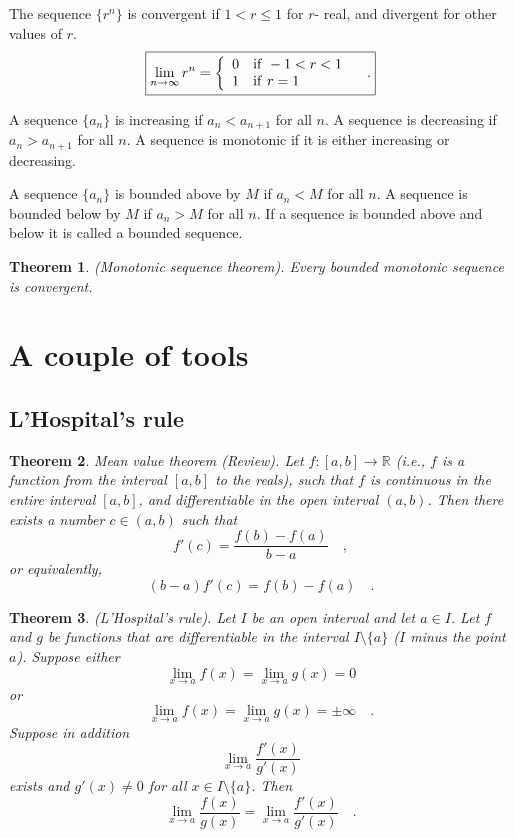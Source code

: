 \documentclass[12pt]{book}
\newcommand{\importantFormula}[1]{\begin{equation} \boxed{#1} \end{equation}}
\newtheorem{theorem}{Theorem}[section]
\begin{document}
The sequence $\{r^n\}$ is convergent if $1< r\leq 1$ for $r$- real, and divergent for other values of $r$.
\importantFormula{\label{eqLimitRtoTheNth}
\lim\limits_{n\to \infty}r^n= \left\{\begin{array}{ll} 0 & \mathrm{if~} -1<r<1\\ 1& \mathrm{if~} r=1\end{array} \right.\quad .
}

A sequence $\{a_n\}$ is increasing if $a_n<a_{n+1}$ for all $n$. A sequence is decreasing if $a_n>a_{n+1}$ for all $n$. A sequence is monotonic if it is either increasing or decreasing.     

A sequence $\{a_n\}$ is bounded above by $M$ if $a_n<M$ for all $n$. A sequence is bounded below by $M$ if $a_n>M$ for all $n$. If a sequence is bounded above and below it is called a bounded sequence. 

\begin{theorem}\label{thMonotonicSequenceThereom}
 (Monotonic sequence theorem). Every bounded monotonic sequence is convergent.
\end{theorem}
\section{A couple of tools}
\subsection{L'Hospital's rule}
\begin{theorem}
 Mean value theorem (Review). Let $f:[a,b]\to \mathbb R$ (i.e., $f$ is a function from the interval $[a,b]$ to the reals), such that $f$ is continuous in the entire interval $[a,b]$, and differentiable in the open interval $(a,b)$. Then there exists a number $c\in (a,b)$ such that 
\[
f'(c)=\frac{f(b)-f(a)}{b-a}\quad,
\]
or equivalently,
\[
(b-a)f'(c)=f(b)-f(a)\quad .
\]
\end{theorem}

\begin{theorem} 
(L'Hospital's rule). Let $I$ be an open interval and let $a\in I$. Let $f$ and $g$ be functions that are differentiable in the interval $I\setminus \{a\}$ ($I$ minus the point $a$). Suppose either
\[
\lim_{x\to a} f(x)= \lim_{x\to a}g(x)=0
\]
or
\[
\lim_{x\to a} f(x)= \lim_{x\to a}g(x)=\pm \infty\quad .
\]
Suppose in addition 
\[
\lim_{x\to a} \frac{f'(x)}{g'(x)}
\]
exists and $g'(x)\neq 0$ for all $x\in I\setminus \{a\}$. Then 
\[ 
\lim_{x\to a}\frac{f(x)}{g(x)}= \lim_{x\to a} \frac{f'(x)}{g'(x)}\quad .
\]
\end{theorem}
\end{document}
